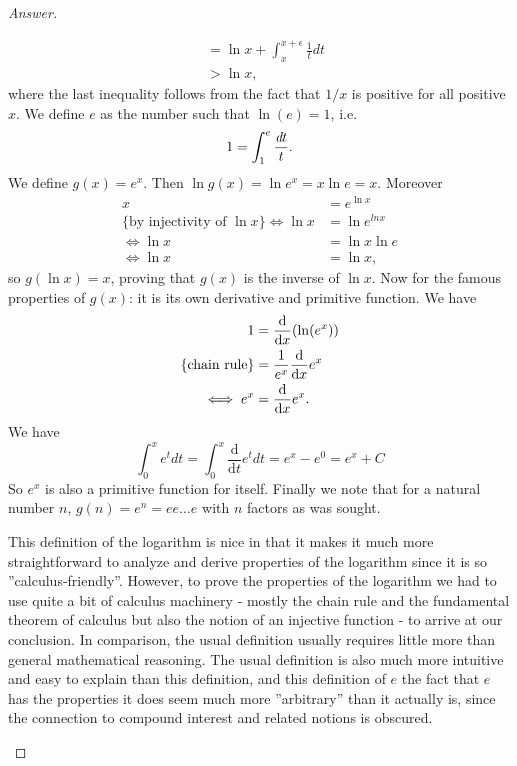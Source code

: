 \begin{proof}[Answer]
\begin{enumerate}[wide]
\[\begin{aligned}
&= \ln{x} + \int_{x}^{x+\epsilon}\frac{1}{t}dt \\
&> \ln{x},
\end{aligned}
  \]
where the last inequality follows from the fact that $1/x$ is positive for all positive $x$. We define $e$ as the number such that $\ln(e) = 1$, i.e.
  \[
  1 =\int_1^e \frac{\emph{d} t}{t}.
  \]
  We define $g(x) = e^x$. Then $\ln{g(x)} = \ln{e^x} = x\ln{e} = x$. Moreover
  \[
  \begin{aligned}
x &= e^{\ln{x}} \\
\{\text{by injectivity of $\ln{x}$}\}\iff \ln{x} &= \ln{e^{ln{x}}} \\
\iff \ln{x} &= \ln{x}\ln{e} \\
\iff \ln{x} &= \ln{x},
\end{aligned}
  \]
so $g(\ln{x}) = x$, proving that $g(x)$ is the inverse of $\ln{x}$.
Now for the famous properties of $g(x)$: it is its own derivative and primitive function.
We have
\[
\begin{aligned}
  1 &= \frac{\text{d}}{\text{d}x} (\ln(e^x)) \\
  \{\text{chain rule}\} &= \frac{1}{e^x}\frac{\text{d}}{\text{d}x} e^x \\
  \iff e^x &= \frac{\text{d}}{\text{d}x} e^x.
\end{aligned}
\]
We have
\[
\int_0^x e^t dt = \int_0^x \frac{\text{d}}{\text{d}t} e^t dt = e^x - e^0 = e^x + C
\]
So $e^x$ is also a primitive function for itself. Finally we note that for a natural number $n$, $g(n) = e^n  = ee\ldots e$ with $n$ factors as was sought.


This definition of the logarithm is nice in that it makes it much more straightforward to analyze and derive properties of the logarithm since it is so ''calculus-friendly''. However, to prove the properties of the logarithm we had to use quite a bit of calculus machinery - mostly the chain rule and the fundamental theorem of calculus but also the notion of an injective function - to arrive at our conclusion. In comparison, the usual definition usually requires little more than general mathematical reasoning. The usual definition is also much more intuitive and easy to explain than this definition, and this definition of $e$ the fact that $e$ has the properties it does seem much more ''arbitrary'' than it actually is, since the connection to compound interest and related notions is obscured.
\end{enumerate}
\end{proof}
\newpage



